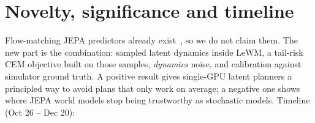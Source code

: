 \documentclass{article}
\begin{document}
\section{Novelty, significance and timeline}

Flow-matching JEPA predictors already exist~\cite{huo2026flowjepa}, so we do not claim them. The new part is the combination: sampled latent dynamics inside LeWM, a tail-risk CEM objective built on those samples, \emph{dynamics} noise, and calibration against simulator ground truth. A positive result gives single-GPU latent planners a principled way to avoid plans that only work on average; a negative one shows where JEPA world models stop being trustworthy as stochastic models. Timeline (Oct 26 -- Dec 20):


\vspace{0.3em}

{\small


}
\end{document}
